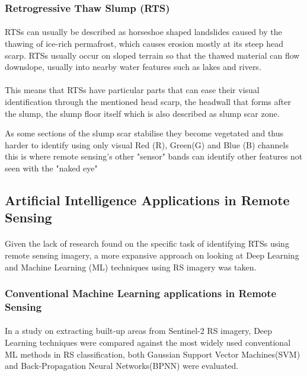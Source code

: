 \documentclass{article}
\begin{document}
\subsubsection{Retrogressive Thaw Slump (RTS)}

\paragraph{}
RTSs can usually be described as horseshoe shaped landslides caused by the thawing of ice-rich permafrost, which causes erosion mostly at its steep head scarp. RTSs usually occur on sloped terrain so that the thawed material can flow downslope, usually into nearby water features such as lakes and rivers. \cite{articleperma}
 
 \paragraph{}
This means that RTSs have particular parts that can ease their visual identification through the mentioned head scarp, the headwall that forms after the slump, the slump floor itself \cite{LANTUIT200884} which is also described as slump scar zone. 

As some sections of the slump scar stabilise they become vegetated \cite{KOKELJ201556} and thus harder to identify using only visual Red (R), Green(G) and Blue (B) channels this is where remote sensing's other "sensor" bands can identify other features not seen with the "naked eye" \cite{HUANG2020111534}


\subsection{Artificial Intelligence Applications in Remote Sensing}
\paragraph{}
Given the lack of research found on the specific task of identifying RTSs using remote sensing imagery, a more expansive approach on looking at Deep Learning and Machine Learning (ML) techniques using RS imagery was taken.

\subsubsection{Conventional Machine Learning applications in Remote Sensing}

\paragraph{}
In a study \cite{isprs-archives-XLII-3-79-2018} on extracting built-up areas from Sentinel-2 RS imagery, Deep Learning techniques were compared against the most widely used conventional ML methods in RS classification, both Gaussian Support Vector Machines(SVM) and Back-Propagation Neural Networks(BPNN) were evaluated.
\end{document}
